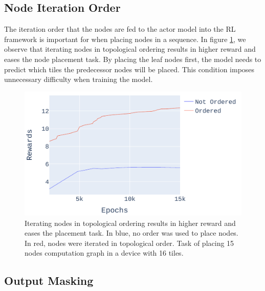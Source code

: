\subsection{Node Iteration Order}

The iteration order that the nodes are fed to the actor model into the RL framework is important for when placing 
nodes in a sequence. In figure \ref{fig:ordered_placement}, we observe that iterating nodes in topological 
ordering results in higher reward and eases the node placement task. By placing the leaf nodes first, the model needs
to predict which tiles the predecessor nodes will be placed. This condition imposes unnecessary difficulty when training the model.

\begin{figure}[h]
  \centering
  \includegraphics[width=\linewidth]{fig/plot_ordered.pdf}
  \caption{Iterating nodes in topological ordering results in higher reward and eases the placement task. 
  In blue, no order was used to place nodes. In red, nodes were iterated in topological order. 
  Task of placing 15 nodes computation graph in a device with 16 tiles.}
  \label{fig:ordered_placement}
\end{figure}


\subsection{Output Masking}






